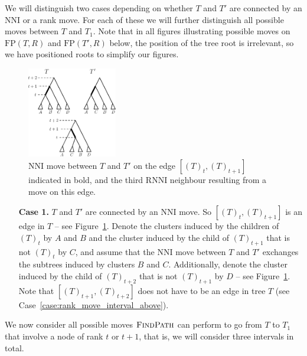 \documentclass[11pt]{amsart}
\newcommand{\rnni}{\mathrm{RNNI}}
\newcommand{\findpath}{\textsc{FindPath}}
\newcommand{\nni}{\mathrm{NNI}}
\newcommand{\fp}{\mathrm{FP}}
\begin{document}
We will distinguish two cases depending on whether $T$ and $T'$ are connected by an $\nni$ or a rank move.
For each of these we will further distinguish all possible moves between $T$ and $T_1$.
Note that in all figures illustrating possible moves on $\fp(T,R)$ and $\fp(T',R)$ below, the position of the tree root is irrelevant, so we have positioned roots to simplify our figures.

\begin{figure}[ht]
\centering
\includegraphics[width=0.35\textwidth]{thm_fp_nni1}
\caption{$\nni$ move between $T$ and $T'$ on the edge $[(T)_t,(T)_{t+1}]$ indicated in bold, and the third $\rnni$ neighbour resulting from a move on this edge.}
\label{fig:thm_fp_nni1}
\end{figure}

\begin{enumerate}
\item[\textbf{Case 1.}]
$T$ and $T'$ are connected by an $\nni$ move.
So $[(T)_t,(T)_{t+1}]$ is an edge in $T$ -- see Figure~\ref{fig:thm_fp_nni1}.
Denote the clusters induced by the children of $(T)_t$ by $A$ and $B$ and the cluster induced by the child of $(T)_{t+1}$ that is not $(T)_t$ by $C$, and assume that the $\nni$ move between $T$ and $T'$ exchanges the subtrees induced by clusters $B$ and $C$.
Additionally, denote the cluster induced by the child of $(T)_{t+2}$ that is not $(T)_{t+1}$ by $D$ -- see Figure~\ref{fig:thm_fp_nni1}.
Note that $[(T)_{t+1}, (T)_{t+2}]$ does not have to be an edge in tree $T$ (see Case~\ref{case:rank_move_interval_above}).
\end{enumerate}

We now consider all possible moves $\findpath$ can perform to go from $T$ to $T_1$ that involve a node of rank $t$ or $t+1$, that is, we will consider three intervals in total.
\end{document}
